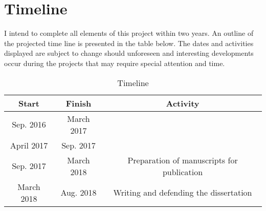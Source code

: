 \documentclass[12pt, preprint,letterpaper]{article}
\begin{document}
\section{Timeline}
I intend to complete all elements of this project within two years. 
An outline of the projected time line is presented in the table below. 
The dates and activities displayed are subject to change should
unforeseen and interesting developments occur during the projects that 
may require special attention and time.
\begin{table}[h]
\caption{Timeline}
\vspace{5mm}
\centering
        \begin{tabular}{|c|c|c|}
            \hline
            Start&Finish&Activity\\
            \hline
            Sep. 2016& March 2017 &  \\
            \hline
            April 2017 & Sep. 2017 &   \\
            \hline
            Sep. 2017 & March 2018 & Preparation of manuscripts for publication \\
            \hline
            March 2018 & Aug. 2018& Writing and defending the dissertation   \\
            \hline
            \end{tabular}
\end{table}
%
%
%
%
\newpage


\end{document}
